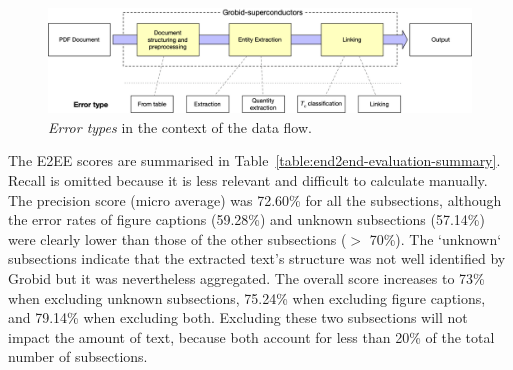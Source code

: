 \documentclass[]{interact}
\theoremstyle{plain}%
\theoremstyle{definition}
\theoremstyle{remark}
\begin{document}
\begin{figure}[ht]
    \centering
    \includegraphics[width=\textwidth]{error-types-colors}
    \caption{\textit{Error types} in the context of the data flow. }
    \label{fig:error-types}
\end{figure}

The E2EE scores are summarised in Table~\ref{table:end2end-evaluation-summary}.
Recall is omitted because it is less relevant and difficult to calculate manually.
The precision score (micro average) was 72.60\% for all the subsections, although the error rates of figure captions (59.28\%) and unknown subsections (57.14\%) were clearly lower than those of the other subsections ($>$ 70\%).
The `unknown` subsections indicate that the extracted text's structure was not well identified by Grobid but it was nevertheless aggregated.
The overall score increases to 73\% when excluding unknown subsections, 75.24\% when excluding figure captions, and 79.14\%  when excluding both.
Excluding these two subsections will not impact the amount of text, because both account for less than 20\% of the total number of subsections.
\end{document}
